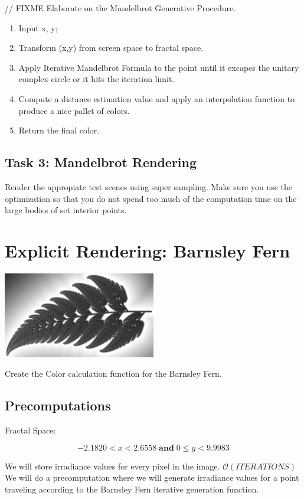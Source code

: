 \documentclass[12pt, letterpaper]{article}
\newcommand{\bigO}{\mathcal{O}}
\begin{document}
// FIXME Elaborate on the Mandelbrot Generative Procedure.

\begin{enumerate}
\item Input x, y;
\item Transform (x,y) from screen space to fractal space.
\item Apply Iterative Mandelbrot Formula to the point until it excapes the unitary complex circle or it hits the iteration limit.
\item Compute a distance estimation value and apply an interpolation function to produce a nice pallet of colors.
\item Return the final color.
\end{enumerate}

\subsection{Task 3: Mandelbrot Rendering}

Render the appropiate test scenes using super sampling. Make sure you use the optimization so that you do not spend too much of the computation time on the large bodies of set interior points.

\newpage
\section{Explicit Rendering: Barnsley Fern}

\begin{center}
\includegraphics[width=0.5\textwidth]{Fern.png}
\end{center}

Create the Color calculation function for the Barnsley Fern.

\subsection{Precomputations}
Fractal Space:

$$-2.1820 < x < 2.6558 \; \textbf{and} \; 0 \le y < 9.9983$$

We will store irradiance values for every pixel in the image. $\bigO(ITERATIONS)$
We will do a precomputation where we will generate irradiance values for a point traveling according to the Barnsley Fern iterative generation function.
\end{document}
